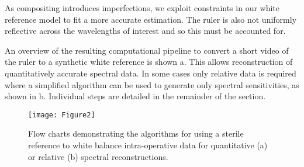 As compositing introduces imperfections, we exploit constraints in our white reference model to fit a more accurate estimation.
%
The ruler is also not uniformly reflective across the wavelengths of interest and so this must be accounted for.
%

An overview of the resulting computational pipeline to convert a short video of the ruler to a synthetic white reference is shown a. This allows reconstruction of quantitatively accurate spectral data. In some cases only relative data is required where a simplified algorithm can be used to generate only spectral sensitivities, as shown in b. Individual steps are detailed in the remainder of the section.
% 
%
%   
%     
%     
%    
% 
\begin{figure}[htb]
	\centering
        \texttt{[image: Figure2]}
 \caption{Flow charts demonstrating the algorithms for using a sterile reference to white balance intra-operative data for quantitative (a) or relative (b) spectral reconstructions.}
 \label{fig:algorithm}
\end{figure}

